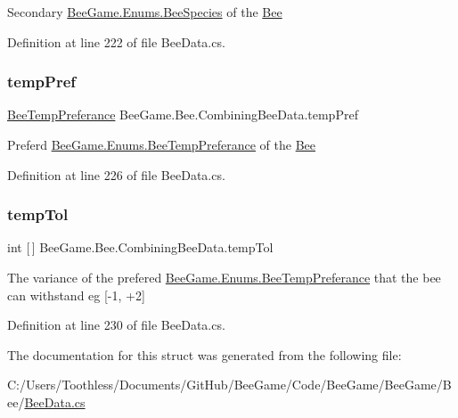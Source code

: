 Secondary \hyperlink{namespace_bee_game_1_1_enums_aa2ead984825678d83c42d48f6382619c}{Bee\+Game.\+Enums.\+Bee\+Species} of the \hyperlink{namespace_bee_game_1_1_bee}{Bee} 



Definition at line 222 of file Bee\+Data.\+cs.

\mbox{\label{struct_bee_game_1_1_bee_1_1_combining_bee_data_a93f8cb5caf0b68dd597da1b3ab9e27b5}} 
\subsubsection{\texorpdfstring{temp\+Pref}{tempPref}}
{\footnotesize\ttfamily \hyperlink{namespace_bee_game_1_1_enums_a9db0f9ac859fab168654d657f248b024}{Bee\+Temp\+Preferance} Bee\+Game.\+Bee.\+Combining\+Bee\+Data.\+temp\+Pref}



Preferd \hyperlink{namespace_bee_game_1_1_enums_a9db0f9ac859fab168654d657f248b024}{Bee\+Game.\+Enums.\+Bee\+Temp\+Preferance} of the \hyperlink{namespace_bee_game_1_1_bee}{Bee} 



Definition at line 226 of file Bee\+Data.\+cs.

\mbox{\label{struct_bee_game_1_1_bee_1_1_combining_bee_data_a31cebfaca3139379e30a43fa0ac7e338}} 
\subsubsection{\texorpdfstring{temp\+Tol}{tempTol}}
{\footnotesize\ttfamily int \mbox{[}$\,$\mbox{]} Bee\+Game.\+Bee.\+Combining\+Bee\+Data.\+temp\+Tol}



The variance of the prefered \hyperlink{namespace_bee_game_1_1_enums_a9db0f9ac859fab168654d657f248b024}{Bee\+Game.\+Enums.\+Bee\+Temp\+Preferance} that the bee can withstand eg \mbox{[}-\/1, +2\mbox{]} 



Definition at line 230 of file Bee\+Data.\+cs.



The documentation for this struct was generated from the following file\+:\begin{DoxyCompactItemize}
\item 
C\+:/\+Users/\+Toothless/\+Documents/\+Git\+Hub/\+Bee\+Game/\+Code/\+Bee\+Game/\+Bee\+Game/\+Bee/\hyperlink{_bee_data_8cs}{Bee\+Data.\+cs}\end{DoxyCompactItemize}
